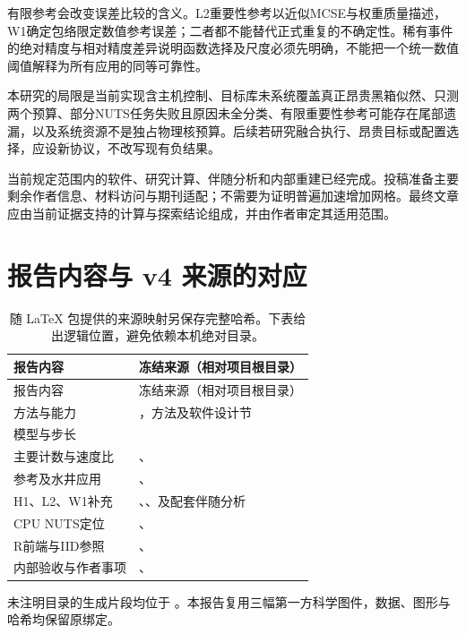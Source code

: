 \documentclass[UTF8,zihao=-4,a4paper,fontset=fandol]{ctexart}
\begin{document}
有限参考会改变误差比较的含义。L2重要性参考以近似MCSE与权重质量描述，W1确定包络限定数值参考误差；二者都不能替代正式重复的不确定性。稀有事件的绝对精度与相对精度差异说明函数选择及尺度必须先明确，不能把一个统一数值阈值解释为所有应用的同等可靠性。

本研究的局限是当前实现含主机控制、目标库未系统覆盖真正昂贵黑箱似然、只测两个预算、部分NUTS任务失败且原因未全分类、有限重要性参考可能存在尾部遗漏，以及系统资源不是独占物理核预算。后续若研究融合执行、昂贵目标或配置选择，应设新协议，不改写现有负结果。

当前规定范围内的软件、研究计算、伴随分析和内部重建已经完成。投稿准备主要剩余作者信息、材料访问与期刊适配；不需要为证明普遍加速增加网格。最终文章应由当前证据支持的计算与探索结论组成，并由作者审定其适用范围。

\clearpage
\appendix
\section{报告内容与 v4 来源的对应}
\begin{longtable}{P{36mm}P{108mm}}
\caption{随 LaTeX 包提供的来源映射另保存完整哈希。下表给出逻辑位置，避免依赖本机绝对目录。}\\
\toprule 报告内容 & 冻结来源（相对项目根目录）\\\midrule\endfirsthead
\toprule 报告内容 & 冻结来源（相对项目根目录）\\\midrule\endhead
方法与能力 & ，方法及软件设计节\\
模型与步长 & \\
主要计数与速度比 & 、\\
参考及水井应用 & 、\\
H1、L2、W1补充 & 、、及配套伴随分析\\
CPU NUTS定位 & 、\\
R前端与IID参照 & 、\\
内部验收与作者事项 & 、\\\bottomrule
\end{longtable}
未注明目录的生成片段均位于 。本报告复用三幅第一方科学图件，数据、图形与哈希均保留原绑定。

\clearpage
\end{document}
